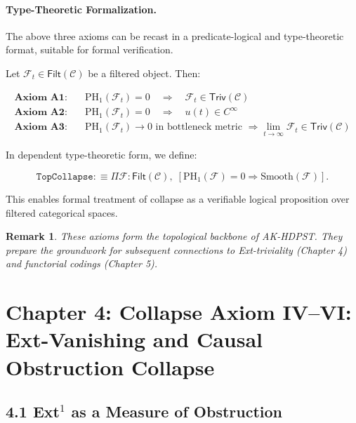 \documentclass[11pt]{article}
\newtheorem{remark}[theorem]{Remark}
\begin{document}
\paragraph{Type-Theoretic Formalization.}
The above three axioms can be recast in a predicate-logical and type-theoretic format, suitable for formal verification.

Let \( \mathcal{F}_t \in \mathsf{Filt}(\mathcal{C}) \) be a filtered object. Then:

\begin{align*}
\textbf{Axiom A1:} &\quad \mathrm{PH}_1(\mathcal{F}_t) = 0 \quad \Rightarrow \quad \mathcal{F}_t \in \mathsf{Triv}(\mathcal{C}) \\
\textbf{Axiom A2:} &\quad \mathrm{PH}_1(\mathcal{F}_t) = 0 \quad \Rightarrow \quad u(t) \in C^\infty \\
\textbf{Axiom A3:} &\quad \mathrm{PH}_1(\mathcal{F}_t) \to 0 \text{ in bottleneck metric } \Rightarrow \lim_{t \to \infty} \mathcal{F}_t \in \mathsf{Triv}(\mathcal{C})
\end{align*}

In dependent type-theoretic form, we define:

\[
\texttt{TopCollapse} :\equiv \Pi \mathcal{F} : \mathsf{Filt}(\mathcal{C}),\; \left[
\mathrm{PH}_1(\mathcal{F}) = 0 \Rightarrow \mathrm{Smooth}(\mathcal{F})
\right].
\]

This enables formal treatment of collapse as a verifiable logical proposition over filtered categorical spaces.

\begin{remark}
These axioms form the topological backbone of AK-HDPST.  
They prepare the groundwork for subsequent connections to Ext-triviality (Chapter 4)  
and functorial codings (Chapter 5).
\end{remark}



\section{Chapter 4: Collapse Axiom IV–VI: Ext-Vanishing and Causal Obstruction Collapse}

\subsection*{4.1 Ext$^1$ as a Measure of Obstruction}
\end{document}
